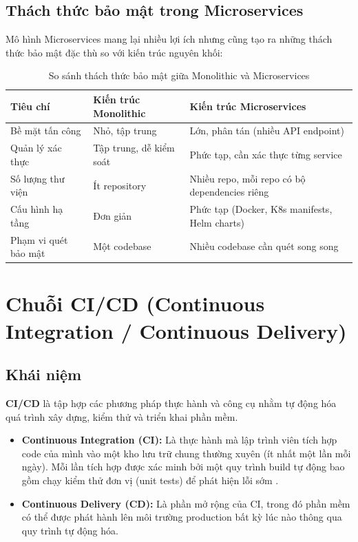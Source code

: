 \documentclass[12pt,a4paper]{report}
\begin{document}
\subsection{Thách thức bảo mật trong Microservices}

Mô hình Microservices mang lại nhiều lợi ích nhưng cũng tạo ra những thách thức bảo mật đặc thù so với kiến trúc nguyên khối:

\begin{table}[H]
\centering
\caption{So sánh thách thức bảo mật giữa Monolithic và Microservices}
\label{tab:security-comparison}
\begin{tabularx}{\textwidth}{|l|X|X|}
\hline
\textbf{Tiêu chí} & \textbf{Kiến trúc Monolithic} & \textbf{Kiến trúc Microservices} \\
\hline
Bề mặt tấn công & Nhỏ, tập trung & Lớn, phân tán (nhiều API endpoint) \\
\hline
Quản lý xác thực & Tập trung, dễ kiểm soát & Phức tạp, cần xác thực từng service \\
\hline
Số lượng thư viện & Ít repository & Nhiều repo, mỗi repo có bộ dependencies riêng \\
\hline
Cấu hình hạ tầng & Đơn giản & Phức tạp (Docker, K8s manifests, Helm charts) \\
\hline
Phạm vi quét bảo mật & Một codebase & Nhiều codebase cần quét song song \\
\hline
\end{tabularx}
\end{table}

\section{Chuỗi CI/CD (Continuous Integration / Continuous Delivery)}

\subsection{Khái niệm}

\textbf{CI/CD} là tập hợp các phương pháp thực hành và công cụ nhằm tự động hóa quá trình xây dựng, kiểm thử và triển khai phần mềm.

\begin{itemize}[leftmargin=2cm]
    \item \textbf{Continuous Integration (CI):} Là thực hành mà lập trình viên tích hợp code của mình vào một kho lưu trữ chung thường xuyên (ít nhất một lần mỗi ngày). Mỗi lần tích hợp được xác minh bởi một quy trình build tự động bao gồm chạy kiểm thử đơn vị (unit tests) để phát hiện lỗi sớm \cite{fowler2006ci}.
    \item \textbf{Continuous Delivery (CD):} Là phần mở rộng của CI, trong đó phần mềm có thể được phát hành lên môi trường production bất kỳ lúc nào thông qua quy trình tự động hóa.
\end{itemize}
\end{document}
